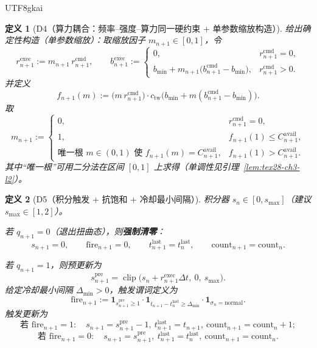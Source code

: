 \documentclass[12pt]{article}
\newtheorem{definition}{定义}[section]
\newcommand{\indicator}[1]{\mathbf{1}_{#1}}
\newcommand{\clip}{\operatorname{clip}}
\begin{document}
\begin{CJK*}{UTF8}{gkai}
\begin{definition}[D4（算力耦合：频率--强度--算力同一硬约束 + 单参数缩放构造）]
给出确定性构造（单参数缩放）：取缩放因子 $m_{n+1}\in[0,1]$，令
\[
  r^{\mathrm{exec}}_{n+1}:=m_{n+1}\,r^{\mathrm{cmd}}_{n+1},
  \qquad
  b^{\mathrm{exec}}_{n+1}:=
  \begin{cases}
    0,& r^{\mathrm{cmd}}_{n+1}=0,\\
    b_{\min}+m_{n+1}\bigl(b^{\mathrm{cmd}}_{n+1}-b_{\min}\bigr),& r^{\mathrm{cmd}}_{n+1}>0.
  \end{cases}
\]
并定义
\[
  f_{n+1}(m):=\bigl(m\,r^{\mathrm{cmd}}_{n+1}\bigr)\cdot
  c_{\mathrm{tw}}\!\bigl(b_{\min}+m(b^{\mathrm{cmd}}_{n+1}-b_{\min})\bigr).
\]
取
\[
  m_{n+1}:=
  \begin{cases}
    0,& r^{\mathrm{cmd}}_{n+1}=0,\\
    1,& f_{n+1}(1)\le C^{\mathrm{avail}}_{n+1},\\
    \text{唯一根 }m\in(0,1)\text{ 使 }f_{n+1}(m)=C^{\mathrm{avail}}_{n+1},& f_{n+1}(1)>C^{\mathrm{avail}}_{n+1}.
  \end{cases}
\]
其中“唯一根”可用二分法在区间 $[0,1]$ 上求得（单调性见引理~\ref{lem:tex28-ch3-l2}）。
\end{definition}

\begin{definition}[D5（积分触发 + 抗饱和 + 冷却最小间隔）]
\label{def:tex28-ch3-d5}
积分器 $s_n\in[0,s_{\max}]$（建议 $s_{\max}\in[1,2]$）。

若 $q_{n+1}=0$（退出扭曲态），则\textbf{强制清零}：
\[
  s_{n+1}=0,
  \qquad
  \mathrm{fire}_{n+1}=0,
  \qquad
  t^{\mathrm{last}}_{n+1}=t^{\mathrm{last}}_{n},
  \qquad
  \mathrm{count}_{n+1}=\mathrm{count}_n.
\]

若 $q_{n+1}=1$，则预更新为
\[
  s^{\mathrm{pre}}_{n+1}=\clip\bigl(s_n+r^{\mathrm{exec}}_{n+1}\Delta t,\ 0,\ s_{\max}\bigr).
\]
给定冷却最小间隔 $\Delta_{\min}>0$，触发谓词定义为
\[
  \mathrm{fire}_{n+1}:=
  \indicator{s^{\mathrm{pre}}_{n+1}\ge 1}\cdot
  \indicator{t_{n+1}-t^{\mathrm{last}}_{n}\ge \Delta_{\min}}\cdot
  \indicator{\sigma_n=\mathrm{normal}}.
\]
触发更新为
\[
  \text{若 }\mathrm{fire}_{n+1}=1:\quad
  s_{n+1}=s^{\mathrm{pre}}_{n+1}-1,\
  t^{\mathrm{last}}_{n+1}=t_{n+1},\
  \mathrm{count}_{n+1}=\mathrm{count}_n+1;
\]
\[
  \text{若 }\mathrm{fire}_{n+1}=0:\quad
  s_{n+1}=s^{\mathrm{pre}}_{n+1},\
  t^{\mathrm{last}}_{n+1}=t^{\mathrm{last}}_{n},\
  \mathrm{count}_{n+1}=\mathrm{count}_n.
\]
\end{definition}


\end{CJK*}
\end{document}
